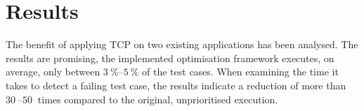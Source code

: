 \section*{Results}
The benefit of applying TCP on two existing applications has been analysed. The results are promising, the implemented optimisation framework executes, on average, only between $\SIrange{3}{5}{\percent}$ of the test cases. When examining the time it takes to detect a failing test case, the results indicate a reduction of more than $\SIrange{30}{50}{}$ times compared to the original, unprioritised execution.